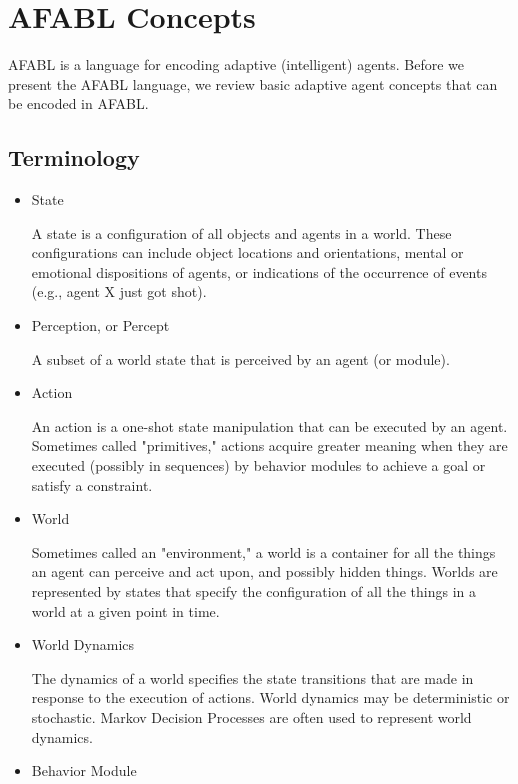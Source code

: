 \section{AFABL Concepts}

AFABL is a language for encoding adaptive (intelligent) agents. Before we present the AFABL language, we review basic adaptive agent concepts that can be encoded in AFABL.

\subsection{Terminology}

\begin{itemize}

\item State

  A state is a configuration of all objects and agents in a world. These configurations can include object locations and orientations, mental or emotional dispositions of agents, or indications of the occurrence of events (e.g., agent X just got shot).

\item Perception, or Percept

  A subset of a world state that is perceived by an agent (or module).

\item Action

  An action is a one-shot state manipulation that can be executed by an agent.  Sometimes called "primitives," actions acquire greater meaning when they are executed (possibly in sequences) by behavior modules to achieve a goal or satisfy a constraint.


\item World

  Sometimes called an "environment," a world is a container for all the things an agent can perceive and act upon, and possibly hidden things.  Worlds are represented by states that specify the configuration of all the things in a world at a given point in time.

\item World Dynamics

  The dynamics of a world specifies the state transitions that are made in response to the execution of actions.  World dynamics may be deterministic or stochastic.  Markov Decision Processes are often used to represent world dynamics.

\item Behavior Module


\end{itemize}
